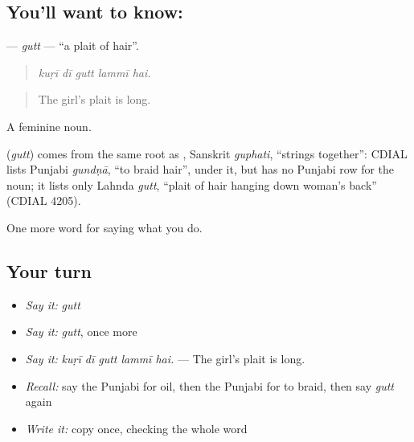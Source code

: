 \subsection*{You'll want to know: }
\textbf{} — \emph{gutt} — \textquotedblleft{}a plait of hair\textquotedblright{}.

\begin{quote}
    
\end{quote}

\begin{quote}
\emph{kuṛī dī gutt lammī hai.}
\end{quote}

\begin{quote}
The girl's plait is long.
\end{quote}

A feminine noun.

\begin{cousinweb}
\textbf{} (\emph{gutt}) comes from the same root as , Sanskrit \emph{guphati}, \textquotedblleft{}strings together\textquotedblright{}: CDIAL lists Punjabi \emph{gundṇā}, \textquotedblleft{}to braid hair\textquotedblright{}, under it, but has no Punjabi row for the noun; it lists only Lahnda \emph{gutt}, \textquotedblleft{}plait of hair hanging down woman's back\textquotedblright{} (CDIAL 4205).
\end{cousinweb}

\begin{grammarlens}[title={What you've built}]
One more word for saying what you do.
\end{grammarlens}

\subsection*{Your turn}
\begin{itemize}
\raggedright
  \item \emph{Say it:} \emph{gutt}
  \item \emph{Say it:} \emph{gutt}, once more
  \item \emph{Say it:} \emph{kuṛī dī gutt lammī hai.} — The girl's plait is long.
  \item \emph{Recall:} say the Punjabi for oil, then the Punjabi for to braid, then say \emph{gutt} again
  \item \emph{Write it:} copy \textbf{} once, checking the whole word
\end{itemize}

